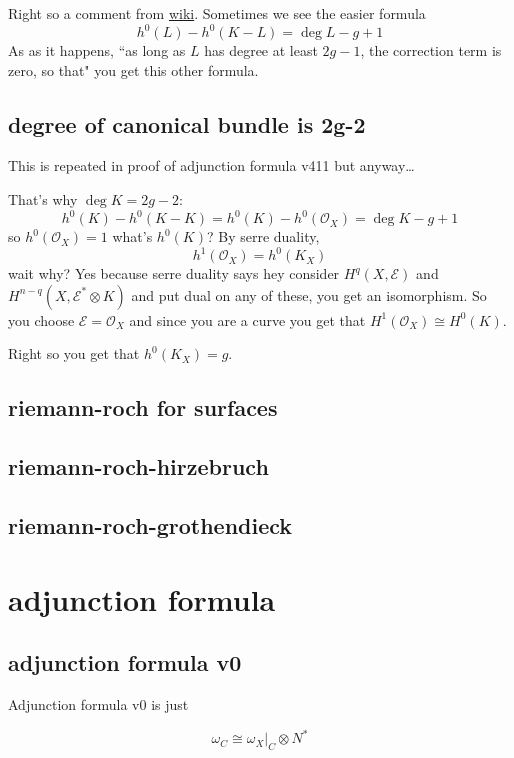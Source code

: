 Right so a comment from \href{https://en.wikipedia.org/wiki/Riemann%E2%80%93Roch_theorem}{wiki}. Sometimes we see the easier formula
	\[\boxed{h^0(L)-h^0(K-L)=\operatorname{deg}L-g+1}\]
	As as it happens, ``as long as \(L\) has degree at least \(2g-1\), the correction term is zero, so that" you get this other formula.

\subsection*{degree of canonical bundle is 2g-2}
This is repeated in proof of adjunction formula v411 but anyway…

That's why \(\operatorname{deg}K=2g-2\):
\[h^0(K)-h^0(K-K)=h^0(K)-h^0(\mathcal{O}_X)=\operatorname{deg}K-g+1\]
so \(h^0(\mathcal{O}_X)=1\) what's \(h^0(K)\)? By serre duality,
\[h^1(\mathcal{O}_X)=h^0(K_X)\]
wait why? Yes because serre duality says hey consider \(H^q(X,\mathcal{E})\) and \(H^{n-q}(X,\mathcal{E}^* \otimes K)\) and put dual on any of these, you get an isomorphism. So you choose \(\mathcal{E}=\mathcal{O}_X\) and since you are a curve you get that \(H^{1}(\mathcal{O}_X)\cong H^{0}(K)\).

Right so you get that \(h^0(K_X)=g\).

\subsection{riemann-roch for surfaces}

\subsection{riemann-roch-hirzebruch}

\subsection{riemann-roch-grothendieck}


\section{adjunction formula}

\subsection{adjunction formula v0}

Adjunction formula v0 is just

\[
\omega_C \cong \omega_X|_C \otimes N^*
\]

